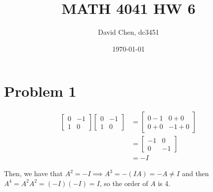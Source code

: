 \documentclass[12pt,letterpaper]{article}
\title{MATH 4041 HW 6}
\author{David Chen, dc3451}
\date{\today}
\theoremstyle{definition}
\begin{document}
\maketitle

\section*{Problem 1}

\begin{align*}
  \begin{bmatrix}
    0 & -1 \\
    1 & 0
  \end{bmatrix}
  \begin{bmatrix}
    0 & -1 \\
    1 & 0
  \end{bmatrix} &=
  \begin{bmatrix}
    0 - 1 & 0 + 0 \\
    0 + 0 & -1 + 0
  \end{bmatrix} \\
  &=
  \begin{bmatrix}
    -1 & 0 \\
    0 & -1
  \end{bmatrix} \\
      &= -I
\end{align*}

Then, we have that $A^{2} = -I \implies A^{3} = -(IA) = -A \neq I$ and then $A^{4} = A^{2}A^{2} = (-I)(-I)=  I$, so the order of $A$ is 4.
\end{document}
